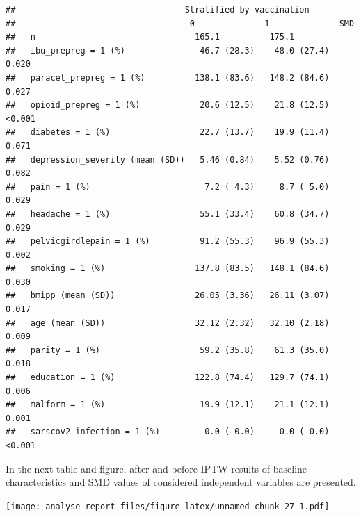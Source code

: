 \documentclass[
]{article}
\begin{document}
\begin{verbatim}
##                                  Stratified by vaccination
##                                   0              1              SMD   
##   n                                165.1          175.1               
##   ibu_prepreg = 1 (%)               46.7 (28.3)    48.0 (27.4)   0.020
##   paracet_prepreg = 1 (%)          138.1 (83.6)   148.2 (84.6)   0.027
##   opioid_prepreg = 1 (%)            20.6 (12.5)    21.8 (12.5)  <0.001
##   diabetes = 1 (%)                  22.7 (13.7)    19.9 (11.4)   0.071
##   depression_severity (mean (SD))   5.46 (0.84)    5.52 (0.76)   0.082
##   pain = 1 (%)                       7.2 ( 4.3)     8.7 ( 5.0)   0.029
##   headache = 1 (%)                  55.1 (33.4)    60.8 (34.7)   0.029
##   pelvicgirdlepain = 1 (%)          91.2 (55.3)    96.9 (55.3)   0.002
##   smoking = 1 (%)                  137.8 (83.5)   148.1 (84.6)   0.030
##   bmipp (mean (SD))                26.05 (3.36)   26.11 (3.07)   0.017
##   age (mean (SD))                  32.12 (2.32)   32.10 (2.18)   0.009
##   parity = 1 (%)                    59.2 (35.8)    61.3 (35.0)   0.018
##   education = 1 (%)                122.8 (74.4)   129.7 (74.1)   0.006
##   malform = 1 (%)                   19.9 (12.1)    21.1 (12.1)   0.001
##   sarscov2_infection = 1 (%)         0.0 ( 0.0)     0.0 ( 0.0)  <0.001
\end{verbatim}

In the next table and figure, after and before IPTW results of baseline
characteristics and SMD values of considered independent variables are
presented.

\texttt{[image: analyse\_report\_files/figure-latex/unnamed-chunk-27-1.pdf]}
\end{document}
